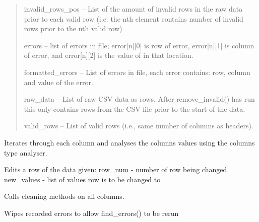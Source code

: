 \documentclass[letterpaper,10pt,english]{sphinxmanual}
\begin{document}
\begin{fulllineitems}
\begin{quote}
invalid\_rows\_pos -- List of the amount of invalid rows in the raw data prior
to each valid row (i.e. the nth element contains number of invalid rows
prior to the nth valid row)

errors -- list of errors in file; error{[}n{]}{[}0{]} is row of error, error{[}n{]}{[}1{]}
is column of error, and error{[}n{]}{[}2{]} is the value of in that location.

formatted\_errors -- List of errors in file, each error contains: row, column 
and value of the error.

raw\_data -- List of raw CSV data as rows. After remove\_invalid() has run
this only contains rows from the CSV file prior to the start of the data.

valid\_rows -- List of valid rows (i.e., same number of columns as headers).
\end{quote}

\begin{fulllineitems}
\label{Code_rst/dat:data.Data.analysis}
Iterates through each column and analyses the columns values using the
columns type analyser.

\end{fulllineitems}


\begin{fulllineitems}
\label{Code_rst/dat:data.Data.change_row}
Edits a row of the data given:
row\_num - number of row being changed
new\_values - list of values row is to be changed to

\end{fulllineitems}


\begin{fulllineitems}
\label{Code_rst/dat:data.Data.clean}
Calls cleaning methods on all columns.

\end{fulllineitems}


\begin{fulllineitems}
\label{Code_rst/dat:data.Data.clear_errors}
Wipes recorded errors to allow find\_errors() to be rerun


\end{fulllineitems}
\end{fulllineitems}
\end{document}
